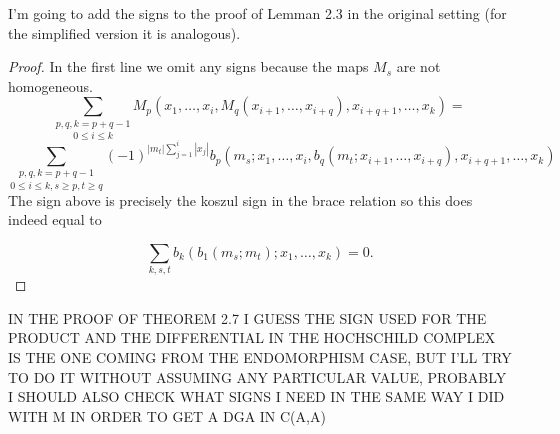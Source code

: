 \documentclass[twoside]{article}
\begin{document}
I'm going to add the signs to the proof of Lemman 2.3 in the original setting (for the simplified version it is analogous).

\begin{lemma}
\end{lemma}
\begin{proof}
In the first line we omit any signs because the maps $M_s$ are not homogeneous.
\[
\underset{0\leq i\leq k}{\sum_{p,q,k=p+q-1}}M_p(x_1,\dots, x_i, M_q(x_{i+1},\dots, x_{i+q}),x_{i+q+1},\dots, x_k)=
\]
\[
\underset{0\leq i\leq k, s\geq p,t\geq q}{\sum_{p,q,k=p+q-1}}(-1)^{|m_t|\sum_{j=1}^i|x_j|}b_p(m_s;x_1,\dots, x_i, b_q(m_t;x_{i+1},\dots, x_{i+q}),x_{i+q+1},\dots, x_k)
\]
The sign above is precisely the koszul sign in the brace relation so this does indeed equal to 

\[
\sum_{k,s,t}b_k(b_1(m_s;m_t);x_1,\dots, x_k)=0.
\]
\end{proof}

IN THE PROOF OF THEOREM 2.7 I GUESS THE SIGN USED FOR THE PRODUCT AND THE DIFFERENTIAL IN THE HOCHSCHILD COMPLEX IS THE ONE COMING FROM THE ENDOMORPHISM CASE, BUT I'LL TRY TO DO IT WITHOUT ASSUMING ANY PARTICULAR VALUE, PROBABLY I SHOULD ALSO CHECK WHAT SIGNS I NEED IN THE SAME WAY I DID WITH M IN ORDER TO GET A DGA IN C(A,A)
\end{document}

